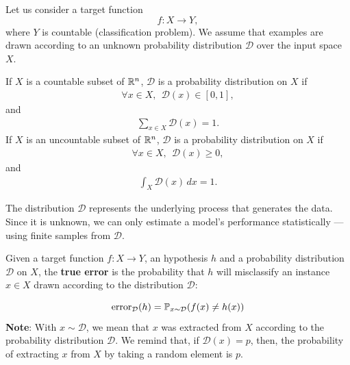 \documentclass[10pt, letterpaper]{report}
\begin{document}
\bigskip
Let us consider a target function
\begin{equation}
	f : X \rightarrow Y,
\end{equation}
where $Y$ is countable (classification problem).
We assume that examples are drawn according to an unknown probability distribution $\mathcal D$ over the input space $X$.

\begin{definition}\label{def:prob_distr}
	If $X$ is a countable subset of ${\mathbb R}^n$, $\mathcal D$ is a probability distribution on $X$ if
	\begin{eqnarray}
		\forall x\in X, \ \ \mathcal D(x)\in [0,1],
	\end{eqnarray}
	and
	\begin{align*}
		\sum_{x\in X}\mathcal D(x)=1.
	\end{align*}
	\newpage
	If $X$ is an uncountable subset of ${\mathbb R}^n$, $\mathcal D$ is a probability distribution on $X$ if
	\begin{eqnarray}
		\forall x\in X, \ \ \mathcal D(x)\ge 0,
	\end{eqnarray}
	and
	\begin{align*}
		\int_X\mathcal D(x)\,dx=1.
	\end{align*}
\end{definition}

The distribution $\mathcal D$ represents the underlying process that generates the data.
Since it is unknown, we can only estimate a model’s performance statistically — using finite samples from $\mathcal D$.

\bigskip
\begin{definition}
	Given a target function $f:X\rightarrow Y$, an hypothesis $h$ and a probability distribution $\mathcal D$ on $X$, the \textbf{true error} is the probability that $h$ will misclassify an instance $x\in X$ drawn according to the distribution $\mathcal D$:
\end{definition}
\begin{equation}
	\text{error}_{\mathcal D}(h)=
	{\mathbb P}_{x\sim \mathcal D}
	(f(x)\ne h(x))
\end{equation}
\textbf{Note}: With $x\sim \mathcal D$, we mean that $x$ was extracted from $X$ according to the probability distribution $\mathcal D$. We remind that, if $\mathcal D(x)=p$, then, the probability of extracting $x$ from $X$ by taking a random element is $p$.\bigskip
\end{document}
